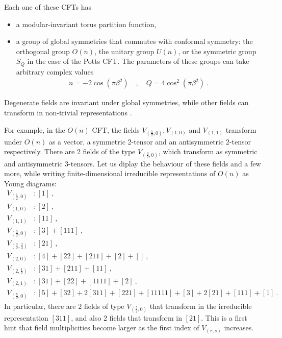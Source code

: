 \documentclass[12pt, a4paper]{article}
\theoremstyle{break}
\begin{document}
Each one of these CFTs has
\begin{itemize}
 \item a modular-invariant torus partition function,
 \item a group of global symmetries that commutes with conformal symmetry: the orthogonal group $O(n)$, the unitary group $U(n)$, or the symmetric group $S_Q$ in the case of the Potts CFT. The parameters of these groups can take arbitrary complex values \cite{gnjrs21, br19}
 \begin{align}
  \boxed{n = -2\cos\left(\pi \beta^2\right)} \quad , \quad \boxed{Q = 4\cos^2\left(\pi \beta^2\right)}\ .
  \label{nQ}
 \end{align}
\end{itemize}
Degenerate fields are invariant under global symmetries, while other fields can transform in non-trivial representations \cite{jrs22, rjrs24}. 

For example, in the $O(n)$ CFT, the fields $V_{(\frac12,0)},V_{(1,0)}$ and $V_{(1,1)}$ transform under $O(n)$ as a vector, a symmetric 2-tensor and an antisymmetric 2-tensor respectively. There are 2 fields of the type $V_{(\frac32,0)}$, which transform as symmetric and antisymmetric 3-tensors. Let us diplay the behaviour of these fields and a few more, while writing finite-dimensional irreducible representations of $O(n)$ as Young diagrams:
\begin{subequations}
\label{von}
\begin{align}
 V_{(\frac12,0)} &: [1]\ , \label{lhz}
 \\
 V_{(1,0)} &: [2]\ ,
 \\
 V_{(1,1)} &: [11]\ , \label{loo}
 \\
 V_{(\frac32,0)}&: [3]+[111]\ ,
\label{l320}
\\
V_{(\frac32,\frac23)} &: [21]\ ,
\label{l3223}
\\
V_{(2,0)}&: [4]+[22]+[211]+[2]+[]\ ,
\label{l20}
\\
V_{(2,\frac12)}& : [31]+[211]+[11]\ ,
\\
V_{(2,1)} &: [31]+[22]+[1111]+[2]\ ,
\label{l21}
\\
V_{(\frac52,0)} &: [5]+[32]+2[311]+[221]+[11111]+[3]+2[21]+[111]+[1]\ .
\label{l52}
\end{align}
\end{subequations}
In particular, there are 2 fields of type $V_{(\frac52,0)}$ that transform in the irreducible representation $[311]$, and also 2 fields that transform in $[21]$. This is a first hint that field multiplicities become larger as the first index of $V_{(r,s)}$ increases. 
\end{document}
